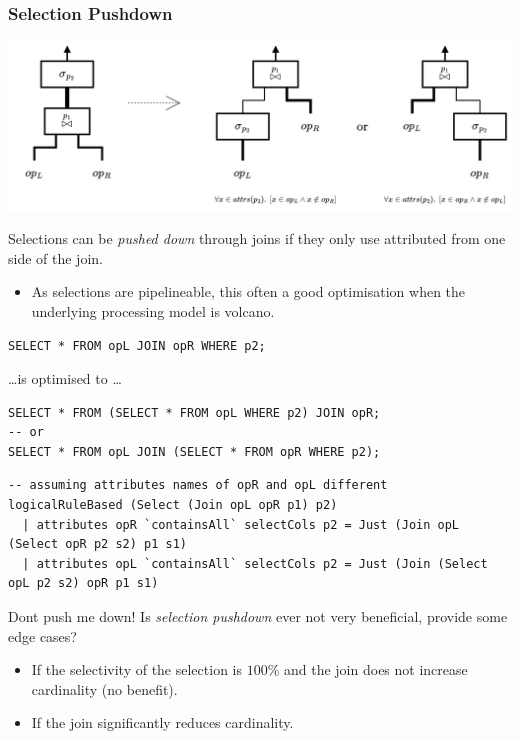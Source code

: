 \subsubsection{Selection Pushdown}
\begin{center}
    \includegraphics[width=.9\textwidth]{optimisation/images/push_down_selection.drawio.png}
\end{center}
Selections can be \textit{pushed down} through joins if they only use attributed from one side of the join.
\begin{itemize}
    \item As selections are pipelineable, this often a good optimisation when the underlying processing model is volcano.
\end{itemize}
\begin{verbatim}
SELECT * FROM opL JOIN opR WHERE p2;
\end{verbatim}
\dots is optimised to \dots
\begin{verbatim}
SELECT * FROM (SELECT * FROM opL WHERE p2) JOIN opR;
-- or
SELECT * FROM opL JOIN (SELECT * FROM opR WHERE p2);
\end{verbatim}
\begin{verbatim}
-- assuming attributes names of opR and opL different
logicalRuleBased (Select (Join opL opR p1) p2) 
  | attributes opR `containsAll` selectCols p2 = Just (Join opL (Select opR p2 s2) p1 s1)
  | attributes opL `containsAll` selectCols p2 = Just (Join (Select opL p2 s2) opR p1 s1)
\end{verbatim}

\begin{examplebox}{Dont push me down!}
    Is \textit{selection pushdown} ever not very beneficial, provide some edge cases?
    \tcblower
    \begin{itemize}
        \item If the selectivity of the selection is $100\%$ and the join does not increase cardinality (no benefit).
        \item If the join significantly reduces cardinality.
    \end{itemize}
    \unfinished
\end{examplebox}


